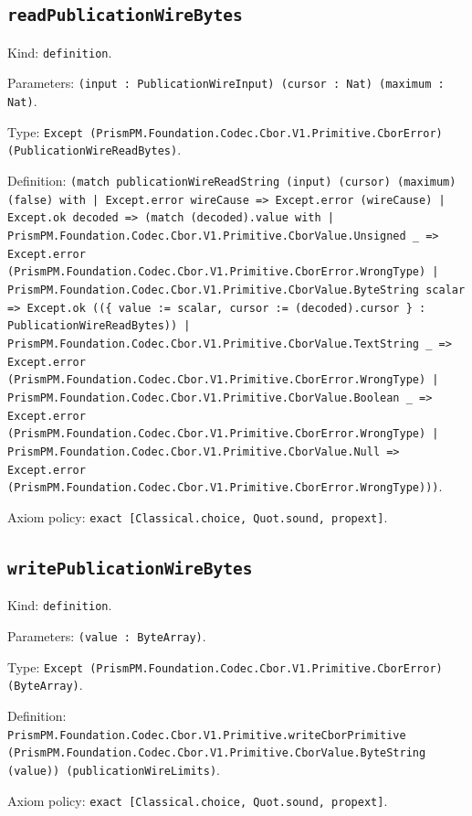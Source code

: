 \documentclass[11pt]{article}
\begin{document}
\subsection*{\texttt{readPublicationWireBytes}}
\noindent Kind: \texttt{definition}.\par
\noindent Parameters: \texttt{(input : PublicationWireInput) (cursor : Nat) (maximum : Nat)}.\par
\noindent Type: \texttt{Except (PrismPM.Foundation.Codec.Cbor.V1.Primitive.CborError) (PublicationWireReadBytes)}.\par
\noindent Definition: \texttt{(match publicationWireReadString (input) (cursor) (maximum) (false) with | Except.error wireCause => Except.error (wireCause) | Except.ok decoded => (match (decoded).value with | PrismPM.Foundation.Codec.Cbor.V1.Primitive.CborValue.Unsigned \_ => Except.error (PrismPM.Foundation.Codec.Cbor.V1.Primitive.CborError.WrongType) | PrismPM.Foundation.Codec.Cbor.V1.Primitive.CborValue.ByteString scalar => Except.ok ((\{ value := scalar, cursor := (decoded).cursor \} : PublicationWireReadBytes)) | PrismPM.Foundation.Codec.Cbor.V1.Primitive.CborValue.TextString \_ => Except.error (PrismPM.Foundation.Codec.Cbor.V1.Primitive.CborError.WrongType) | PrismPM.Foundation.Codec.Cbor.V1.Primitive.CborValue.Boolean \_ => Except.error (PrismPM.Foundation.Codec.Cbor.V1.Primitive.CborError.WrongType) | PrismPM.Foundation.Codec.Cbor.V1.Primitive.CborValue.Null => Except.error (PrismPM.Foundation.Codec.Cbor.V1.Primitive.CborError.WrongType)))}.\par
\noindent Axiom policy: \texttt{exact [Classical.choice, Quot.sound, propext]}.\par
\subsection*{\texttt{writePublicationWireBytes}}
\noindent Kind: \texttt{definition}.\par
\noindent Parameters: \texttt{(value : ByteArray)}.\par
\noindent Type: \texttt{Except (PrismPM.Foundation.Codec.Cbor.V1.Primitive.CborError) (ByteArray)}.\par
\noindent Definition: \texttt{PrismPM.Foundation.Codec.Cbor.V1.Primitive.writeCborPrimitive (PrismPM.Foundation.Codec.Cbor.V1.Primitive.CborValue.ByteString (value)) (publicationWireLimits)}.\par
\noindent Axiom policy: \texttt{exact [Classical.choice, Quot.sound, propext]}.\par
\end{document}
